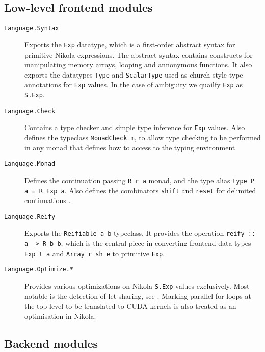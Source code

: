 \subsection*{Low-level frontend modules}
\begin{description}

  \item[\texttt{Language.Syntax}] Exports the \texttt{Exp} datatype,
    which is a first-order abstract syntax for primitive Nikola expressions.
    The abstract syntax contains constructs for manipulating memory arrays,
    looping and annonymous functions. It also exports the datatypes
    \texttt{Type} and \texttt{ScalarType} used as church style type annotations
    for \texttt{Exp} values. In the case of ambiguity we quailfy \texttt{Exp}
    as \texttt{S.Exp}.

  \item[\texttt{Language.Check}] Contains a type checker and simple type
    inference for \texttt{Exp} values. Also defines the typeclass
    \texttt{MonadCheck m}, to allow type checking to be performed in any monad
    that defines how to access to the typing environment

  \item[\texttt{Language.Monad}] Defines the continuation passing
    \texttt{R r a} monad, and the type alias \texttt{type P a = R Exp a}.
    Also defines the combinators \texttt{shift} and \texttt{reset} for
    delimited continuations \cite{wadler1994monads}.

  \item[\texttt{Language.Reify}] Exports the \texttt{Reifiable a b}
    typeclass. It provides the operation \texttt{reify :: a -> R b b},
    which is the central piece in converting frontend data types
    \texttt{Exp t a} and \texttt{Array r sh e} to primitive \texttt{Exp}.

  \item[\texttt{Language.Optimize.*}] Provides various
    optimizations on Nikola \texttt{S.Exp} values exclusively. Most notable is
    the detection of let-sharing, see \cite{mainland2010nikola}. Marking
    parallel for-loops at the top level to be translated to CUDA kernels is
    also treated as an optimisation in Nikola.

\end{description}

\subsection*{Backend modules}

